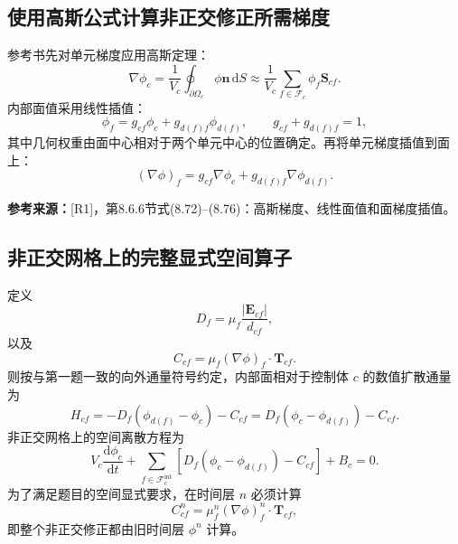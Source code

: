 \documentclass[UTF8,12pt,a4paper]{ctexart}
\numberwithin{equation}{section}
\newcommand{\Rone}{\textnormal{[R1]}}
\newcommand{\source}[1]{%
  \par\smallskip
  \noindent\colorbox{sourcebg}{%
    \parbox{0.955\linewidth}{\raggedright\footnotesize\color{sourcegray}\textbf{参考来源：}#1}%
  }
  \par\smallskip
}
\newcommand{\dd}{\,\mathrm d}
\newcommand{\Sf}{\bm S}
\newcommand{\Ef}{\bm E}
\newcommand{\Tf}{\bm T}
\begin{document}
\subsection{使用高斯公式计算非正交修正所需梯度}

参考书先对单元梯度应用高斯定理：
\begin{equation}
  \nabla\phi_c
  =\frac{1}{V_c}
   \oint_{\partial\Omega_c}\phi\bm n\dd S
  \approx
  \boxed{
  \frac{1}{V_c}
  \sum_{f\in\mathcal F_c}\phi_f\Sf_{cf}}.
  \label{eq:gauss_cell_gradient}
\end{equation}
内部面值采用线性插值：
\begin{equation}
  \phi_f=g_{cf}\phi_c+g_{d(f)f}\phi_{d(f)},
  \qquad g_{cf}+g_{d(f)f}=1,
  \label{eq:linear_face_value}
\end{equation}
其中几何权重由面中心相对于两个单元中心的位置确定。再将单元梯度插值到面上：
\begin{equation}
  \boxed{
  (\nabla\phi)_f
  =g_{cf}\nabla\phi_c
  +g_{d(f)f}\nabla\phi_{d(f)}}.
  \label{eq:face_gradient_interpolation}
\end{equation}

\source{\Rone，第8.6.6节式(8.72)--(8.76)：高斯梯度、线性面值和面梯度插值。}

\subsection{非正交网格上的完整显式空间算子}

定义
\begin{equation}
  D_f=\mu_f\frac{|\Ef_{cf}|}{d_{cf}},
  \label{eq:D_nonorth}
\end{equation}
以及
\begin{equation}
  C_{cf}=\mu_f(\nabla\phi)_f\cdot\Tf_{cf}.
  \label{eq:cross_diffusion}
\end{equation}
则按与第一题一致的向外通量符号约定，内部面相对于控制体 $c$ 的数值扩散通量为
\begin{equation}
  \boxed{
  H_{cf}
  =-D_f(\phi_{d(f)}-\phi_c)-C_{cf}
  =D_f(\phi_c-\phi_{d(f)})-C_{cf}}.
  \label{eq:full_nonorth_flux}
\end{equation}
非正交网格上的空间离散方程为
\begin{equation}
  \boxed{
  V_c\frac{\mathrm d\phi_c}{\mathrm dt}
  +\sum_{f\in\mathcal F_c^{\mathrm{int}}}
  \left[D_f(\phi_c-\phi_{d(f)})-C_{cf}\right]+B_c=0}.
  \label{eq:nonorth_semidiscrete}
\end{equation}
为了满足题目的空间显式要求，在时间层 $n$ 必须计算
\begin{equation}
  C_{cf}^n=\mu_f^n(\nabla\phi)_f^n\cdot\Tf_{cf},
  \label{eq:explicit_correction}
\end{equation}
即整个非正交修正都由旧时间层 $\phi^n$ 计算。
\end{document}
